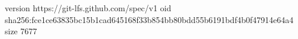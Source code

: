 version https://git-lfs.github.com/spec/v1
oid sha256:fce1ce63835bc15b1cad645168f33b854bb80bdd55b6191bdf4b0f47914e64a4
size 7677
